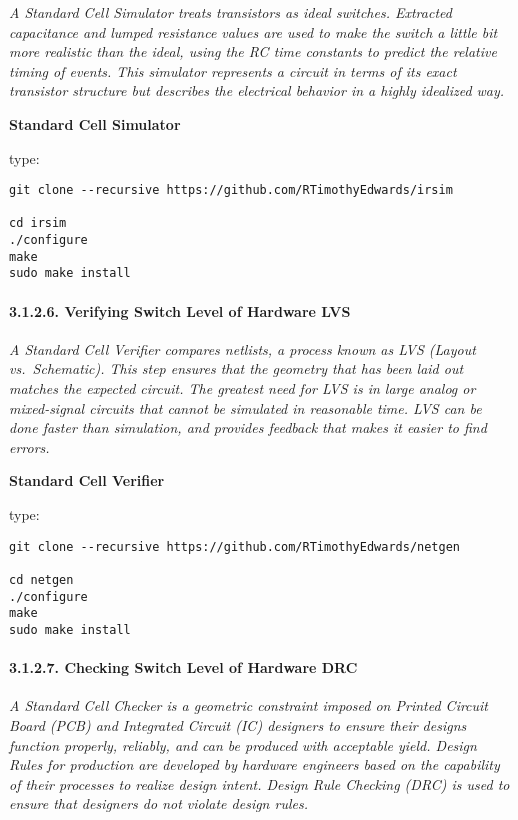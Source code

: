 \documentclass[]{article}
\let\oldparagraph\paragraph
\renewcommand{\paragraph}[1]{\oldparagraph{#1}\mbox{}}
\begin{document}
\emph{A Standard Cell Simulator treats transistors as ideal switches.
Extracted capacitance and lumped resistance values are used to make the
switch a little bit more realistic than the ideal, using the RC time
constants to predict the relative timing of events. This simulator
represents a circuit in terms of its exact transistor structure but
describes the electrical behavior in a highly idealized way.}

\textbf{Standard Cell Simulator}

type:

\begin{verbatim}
git clone --recursive https://github.com/RTimothyEdwards/irsim

cd irsim
./configure
make
sudo make install
\end{verbatim}

\hypertarget{verifying-switch-level-of-hardware-lvs}{%
\paragraph{3.1.2.6. Verifying Switch Level of Hardware
LVS}\label{verifying-switch-level-of-hardware-lvs}}

\emph{A Standard Cell Verifier compares netlists, a process known as LVS
(Layout vs.~Schematic). This step ensures that the geometry that has
been laid out matches the expected circuit. The greatest need for LVS is
in large analog or mixed-signal circuits that cannot be simulated in
reasonable time. LVS can be done faster than simulation, and provides
feedback that makes it easier to find errors.}

\textbf{Standard Cell Verifier}

type:

\begin{verbatim}
git clone --recursive https://github.com/RTimothyEdwards/netgen

cd netgen
./configure
make
sudo make install
\end{verbatim}

\hypertarget{checking-switch-level-of-hardware-drc}{%
\paragraph{3.1.2.7. Checking Switch Level of Hardware
DRC}\label{checking-switch-level-of-hardware-drc}}

\emph{A Standard Cell Checker is a geometric constraint imposed on
Printed Circuit Board (PCB) and Integrated Circuit (IC) designers to
ensure their designs function properly, reliably, and can be produced
with acceptable yield. Design Rules for production are developed by
hardware engineers based on the capability of their processes to realize
design intent. Design Rule Checking (DRC) is used to ensure that
designers do not violate design rules.}
\end{document}
